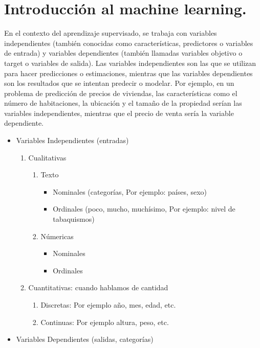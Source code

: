 \documentclass[../main.tex]{subfiles}
\begin{document}

\section{Introducción al machine learning.}

    En el contexto del aprendizaje supervisado, se trabaja con variables independientes (también conocidas como características, predictores o variables de entrada) y variables dependientes (también llamadas variables objetivo o target o variables de salida). Las variables independientes son las que se utilizan para hacer predicciones o estimaciones, mientras que las variables dependientes son los resultados que se intentan predecir o modelar. Por ejemplo, en un problema de predicción de precios de viviendas, las características como el número de habitaciones, la ubicación y el tamaño de la propiedad serían las variables independientes, mientras que el precio de venta sería la variable dependiente.

    \begin{itemize}
        \item Variables Independientes (entradas)
            \begin{enumerate}
                \item Cualitativas
                    \begin{enumerate}
                        \item Texto
                            \begin{itemize}
                                \item Nominales (categorías, Por ejemplo: países, sexo)
                                \item Ordinales (poco, mucho, muchísimo, Por ejemplo: nivel de tabaquismos)
                                
                            \end{itemize}
                        \item Númericas
                            \begin{itemize}
                                \item Nominales
                                \item Ordinales
                            \end{itemize}
                    \end{enumerate}
                \item Cuantitativas: cuando hablamos de cantidad
                    \begin{enumerate}
                        \item Discretas: Por ejemplo año, mes, edad, etc.
                        \item Continuas: Por ejemplo altura, peso, etc.
                    \end{enumerate}
            \end{enumerate}
        \item Variables Dependientes (salidas, categorías)
    \end{itemize}
	
\end{document}
